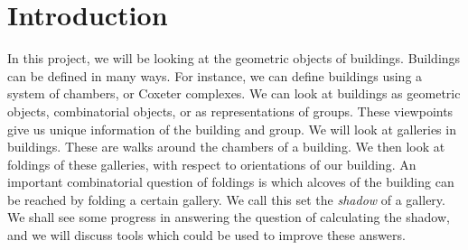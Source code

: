 \documentclass[11pt]{article}
\begin{document}
\newtheorem{theorem}{Theorem}
\theoremstyle{definition}
\newtheorem{definition}{Definition}
\newtheorem{proposition}{Proposition}
\newtheorem{example}{Example}
\newtheorem{lemma}{Lemma}
\newtheorem{corollary}{Corollary}
\newcommand{\uw}{\mathcal{U}(W,X)}
\newcommand{\W}{$(W,S)$}
\newcommand{\ix}{\textit}
\newcommand{\tr}{\textcolor{red}}
\newcommand{\sg}{$\Sigma$}




\section{Introduction}

In this project, we will be looking at the geometric objects of buildings. Buildings can be defined in many ways. For instance, we can define buildings using a system of chambers, or Coxeter complexes. We can look at buildings as geometric objects, combinatorial objects, or as representations of groups. These viewpoints give us unique information of the building and group. We will look at galleries in buildings. These are walks around the chambers of a building. We then look at foldings of these galleries, with respect to orientations of our building. An important combinatorial question of foldings is which alcoves of the building can be reached by folding a certain gallery. We call this set the \ix{shadow} of a gallery. We shall see some progress in answering the question of calculating the shadow, and we will discuss tools which could be used to improve these answers. 
























































\end{document}
